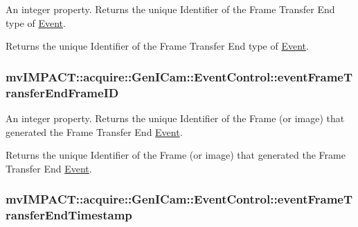 An integer property. Returns the unique Identifier of the Frame Transfer End type of \hyperlink{classmv_i_m_p_a_c_t_1_1acquire_1_1_event}{Event}. 

Returns the unique Identifier of the Frame Transfer End type of \hyperlink{classmv_i_m_p_a_c_t_1_1acquire_1_1_event}{Event}. \hypertarget{classmv_i_m_p_a_c_t_1_1acquire_1_1_gen_i_cam_1_1_event_control_a84206a72c342b079f41a8ed34c608c84}{
\subsubsection[{event\+Frame\+Transfer\+End\+Frame\+I\+D}]{ mv\+I\+M\+P\+A\+C\+T\+::acquire\+::\+Gen\+I\+Cam\+::\+Event\+Control\+::event\+Frame\+Transfer\+End\+Frame\+I\+D}}\label{classmv_i_m_p_a_c_t_1_1acquire_1_1_gen_i_cam_1_1_event_control_a84206a72c342b079f41a8ed34c608c84}


An integer property. Returns the unique Identifier of the Frame (or image) that generated the Frame Transfer End \hyperlink{classmv_i_m_p_a_c_t_1_1acquire_1_1_event}{Event}. 

Returns the unique Identifier of the Frame (or image) that generated the Frame Transfer End \hyperlink{classmv_i_m_p_a_c_t_1_1acquire_1_1_event}{Event}. \hypertarget{classmv_i_m_p_a_c_t_1_1acquire_1_1_gen_i_cam_1_1_event_control_a09d0258736c22952bb7f7d202e1ca17e}{
\subsubsection[{event\+Frame\+Transfer\+End\+Timestamp}]{ mv\+I\+M\+P\+A\+C\+T\+::acquire\+::\+Gen\+I\+Cam\+::\+Event\+Control\+::event\+Frame\+Transfer\+End\+Timestamp}}\label{classmv_i_m_p_a_c_t_1_1acquire_1_1_gen_i_cam_1_1_event_control_a09d0258736c22952bb7f7d202e1ca17e}


